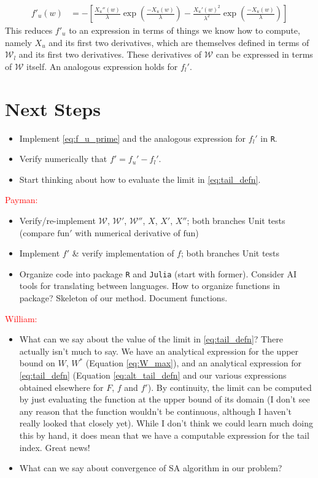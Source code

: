 \documentclass{article}
\newcommand{\sW}{\mathscr{W}}
\begin{document}
\begin{align}
    f'_u(w) &= - \left[ \frac{X_u''(w)}{\lambda} \exp \left( \frac{-X_u(w)}{\lambda} \right) - \frac{X_u'(w)^2}{\lambda^2} \exp \left( \frac{-X_u(w)}{\lambda} \right)\right] \label{eq:f_u_prime}
\end{align}
%
This reduces $f'_u$ to an expression in terms of things we know how to compute, namely $X_u$ and its first two derivatives, which are themselves defined in terms of $\sW_l$ and its first two derivatives. These derivatives of $\sW$ can be expressed in terms of $\sW$ itself. An analogous expression holds for $f_l'$.

\section*{Next Steps}
\begin{itemize}
    \item Implement \ref{eq:f_u_prime} and the analogous expression for $f_l'$ in \texttt{R}.
    \item Verify numerically that $f' = f_u' - f_l'$.
    \item Start thinking about how to evaluate the limit in \eqref{eq:tail_defn}.
\end{itemize}

\textcolor{red}{Payman:}
\begin{itemize}
    \item Verify/re-implement $\sW$, $\sW'$, $\sW''$, $X$, $X'$, $X''$; both branches
        \subitem Unit tests (compare $\text{fun}'$ with numerical derivative of $\text{fun}$)
    \item Implement $f'$ \& verify implementation of $f$; both branches
        \subitem Unit tests
    \item Organize code into package
        \subitem \texttt{R} and \texttt{Julia} (start with former). Consider AI tools for translating between languages.
        \subitem How to organize functions in package?
        \subitem Skeleton of our method.
        \subitem Document functions.
\end{itemize}

\textcolor{red}{William:}
\begin{itemize}
    \item What can we say about the value of the limit in \eqref{eq:tail_defn}?
        \subitem There actually isn't much to say. We have an analytical expression for the upper bound on $W$, $W^*$ (Equation \eqref{eq:W_max}), and an analytical expression for \eqref{eq:tail_defn} (Equation \eqref{eq:alt_tail_defn} and our various expressions obtained elsewhere for $F$, $f$ and $f'$). By continuity, the limit can be computed by just evaluating the function at the upper bound of its domain (I don't see any reason that the function wouldn't be continuous, although I haven't really looked that closely yet). While I don't think we could learn much doing this by hand, it does mean that we have a computable expression for the tail index. Great news!
    \item What can we say about convergence of SA algorithm in our problem?
\end{itemize}
\end{document}
